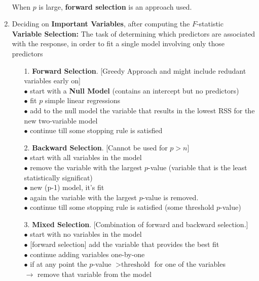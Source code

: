\documentclass{article}
\begin{document}
\begin{enumerate}
    \\ When $p$ is large, \textbf{forward selection} is an approach used. \\
    \item Deciding on \textbf{Important Variables}, after computing the $F$-statistic
    \\ \textbf{Variable Selection:} The task of determining which predictors are associated with the response, in order to fit a single model involving only those predictors
    \begin{enumerate}
        \item[1.] \textbf{Forward Selection}. [Greedy Approach and might include redudant variables early on]
        \\ $\bullet$ start with a \textbf{Null Model} (contains an intercept but no predictors) 
        \\ $\bullet$ fit $p$ simple linear regressions 
        \\ $\bullet$ add to the null model the variable that results in the lowest RSS for the new two-variable model
        \\ $\bullet$ continue till some stopping rule is satisfied \\
        \item[2.] \textbf{Backward Selection}. [Cannot be used for $p>n$]
        \\ $\bullet$ start with all variables in the model
        \\ $\bullet$ remove the variable with the largest $p$-value (variable that is the least statistically significat)
        \\ $\bullet$ new (p-1) model, it's fit
        \\ $\bullet$ again the variable with the largest $p$-value is removed. 
        \\ $\bullet$ continue till some stopping rule is satisfied (some threshold $p$-value) \\
        \item[3.] \textbf{Mixed Selection}. [Combination of forward and backward selection.]
        \\ $\bullet$ start with no variables in the model
        \\ $\bullet$ [forward selection] add the variable that provides the best fit 
        \\ $\bullet$ continue adding variables one-by-one 
        \\ $\bullet$ if at any point the $p$-value $> \text{threshold}$ for one of the variables \\ $\rightarrow$ remove that variable from the model

\end{enumerate}
\end{enumerate}
\end{document}
